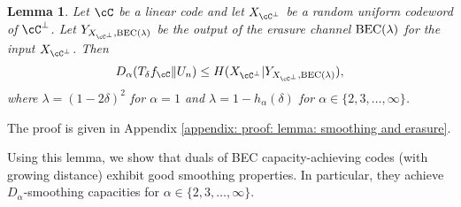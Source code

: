 \documentclass{amsart}
\newtheorem{lemma}[theorem]{Lemma}
\theoremstyle{remark}
\begin{document}
\begin{lemma}\label{lemma: smoothing and erasure}
Let $\cC$ be a linear code and let $X_{\cC^{\bot}}$ be a random uniform codeword of ${\cC^{\bot}}$. Let $Y_{X_{\cC^{\bot}},{\text{\rm BEC}}(\lambda)}$ be the output of the erasure channel ${\text{\rm BEC}}(\lambda)$ for the input $X_{\cC^{\bot}}$.    Then
    \begin{align}\label{eq:EGp}
        D_{\alpha}(T_{\delta}f_{\cC}\|U_n) \leq H(X_{\cC^{\bot}}|Y_{X_{\cC^{\bot}},{\text{\rm BEC}}(\lambda)}),
    \end{align}
where $\lambda  = (1-2\delta)^2$ for $\alpha =1$ and $\lambda = 1-h_{\alpha} (\delta)$ for $\alpha \in \{2,3,\dots,\infty\}$. 
\end{lemma}
The proof is given in Appendix \ref{appendix: proof: lemma: smoothing and erasure}.

Using this lemma, we show that duals of BEC capacity-achieving codes  (with growing distance) exhibit good smoothing properties. In particular, they achieve $D_{\alpha}$-smoothing capacities for $\alpha \in \{2,3,\dots,\infty\}$.
\end{document}
